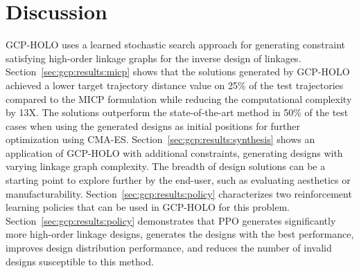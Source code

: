 \section{Discussion}
GCP-HOLO uses a learned stochastic search approach for generating constraint satisfying high-order linkage graphs for the inverse design of linkages. Section~\ref{sec:gcp:results:micp} shows that the solutions generated by GCP-HOLO achieved a lower target trajectory distance value on 25\% of the test trajectories compared to the MICP formulation while reducing the computational complexity by 13X. The solutions outperform the state-of-the-art method in 50\% of the test cases when using the generated designs as initial positions for further optimization using CMA-ES. Section~\ref{sec:gcp:results:synthesis} shows an application of GCP-HOLO with additional constraints, generating designs with varying linkage graph complexity. The breadth of design solutions can be a starting point to explore further by the end-user, such as evaluating aesthetics or manufacturability. Section~\ref{sec:gcp:results:policy} characterizes two reinforcement learning policies that can be used in GCP-HOLO for this problem. Section~\ref{sec:gcp:results:policy} demonstrates that PPO generates significantly more high-order linkage designs, generates the designs with the best performance, improves design distribution performance, and reduces the number of invalid designs susceptible to this method.

